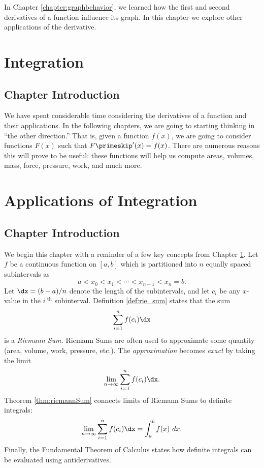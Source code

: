 In Chapter \ref{chapter:graphbehavior}, we learned how the first and second derivatives of a function influence its graph. In this chapter we explore other applications of the derivative.







\clearpage\thispagestyle{empty}\cleardoublepage
\chapter{Integration}\label{chapter:integration}
\thispagestyle{empty}
\iflatexml\section*{Chapter Introduction}\fi

We have spent considerable time considering the derivatives of a function and their applications. In the following chapters, we are going to starting thinking in ``the other direction.'' That is, given a function $f(x)$, we are going to consider functions $F(x)$ such that $F\primeskip'(x) = f(x)$. There are numerous reasons this will prove to be useful: these functions will help us compute areas, volumes, mass, force, pressure, work, and much more.







\clearpage\thispagestyle{empty}\cleardoublepage
\chapter{Applications of Integration}\label{chapter:app_of_int}
\thispagestyle{empty}
\iflatexml\section*{Chapter Introduction}\fi

We begin this chapter with a reminder of a few key concepts from Chapter \ref{chapter:integration}. Let $f$ be a continuous function on $[a,b]$ which is partitioned into $n$ equally spaced subintervals as 
$$a<x_0 < x_1 < \cdots < x_{n-1}<x_n=b.$$
Let $\dx=(b-a)/n$ denote the length of the  subintervals, and let $c_i$ be any $x$-value in the $i^\text{ th}$ subinterval. Definition \ref{def:rie_sum} states that the sum $$\sum_{i=1}^n f(c_i)\dx$$ is a \textit{Riemann Sum.} Riemann Sums are often used to approximate some quantity (area, volume, work, pressure, etc.). The \textit{approximation} becomes \textit{exact} by taking the limit 
$$\lim_{n\to\infty} \sum_{i=1}^n f(c_i)\dx.$$ Theorem \ref{thm:riemannSum} connects limits of Riemann Sums to definite integrals:
$$\lim_{n\to\infty} \sum_{i=1}^n f(c_i)\dx = \int_a^b f(x)\ dx.$$ Finally, the Fundamental Theorem of Calculus states how definite integrals can be evaluated using antiderivatives. 

